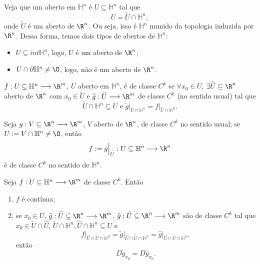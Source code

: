 Veja que um aberto em $\mathbb{H}^{n}$ é $U\subseteq\mathbb{H}^{n}$ tal que \[
U = \widetilde{U} \cap \mathbb{H}^{n}
,\] onde $\widetilde{U}$ é um aberto de $\R^{n}$. Ou seja, isso é $\mathbb{H}^{n}$ munido da topologia induzida por $\R^{n}$. Dessa forma, temos dois tipos de abertos de $\mathbb{H}^{n}$:
\begin{itemize}
    \item $U\subseteq int \mathbb{H}^{n}$, logo, $U$ é um aberto de $\R^{n}$;
    \item $U\cap \partial \mathbb{H}^{n} \neq  \O$, logo, não é um aberto de $\R^{n}$.
\end{itemize}

\begin{definition}
    $f: U\subseteq \mathbb{H}^{n} \longrightarrow \R^{m}$, $U$ aberto em $\mathbb{H}^{n}$, é de classe $C^{k}$ se $\forall x_0\in U$, $\exists \widetilde{U}\subseteq\R^{n}$ aberto de $\R^{n}$ com $x_0\in \widetilde{U}$ e $\widetilde{g}: \widetilde{U} \longrightarrow \R^{m}$ de classe $C^{k}$ (no sentido usual) tal que \[
    \widetilde{U} \cap \mathbb{H}^{n} \subseteq U\text{ e }\widetilde{g}\Big|_{\widetilde{U}\cap \mathbb{H}^{n}} = f\Big|_{\widetilde{U}\cap \mathbb{H}^{n}}
    .\] 
\end{definition}

\begin{remark}
    Seja $g: V\subseteq\R^{n} \longrightarrow \R^{m}$, $V$ aberto de $\R^{n}$, de classe $C^{k}$ no sentido usual; se $U:=V\cap \mathbb{H}^{n}\neq \O$, então \[
    f:= g\Big|_U: U\subseteq \mathbb{H}^{n} \longrightarrow \R^{n}
    \] é de classe $C^{k}$ no sentido de $\mathbb{H}^{n}$.
\end{remark}

\begin{prop}
    Seja $f: U\subseteq\mathbb{H}^{n} \longrightarrow \R^{m}$ de classe $C^{k}$. Então
    \begin{enumerate}
        \item $f$ é contínua;
	\item se $x_0\in U$, $\widetilde{g}: \widetilde{U}\subseteq\R^{n} \longrightarrow \R^{m}$, $\hat{g}: \hat{U} \subseteq\R^{n} \longrightarrow \R^{m} $ são de classe $C^{k}$ tal que $x_0\in \widetilde{U}\cap \hat{U}$, $\widetilde{U}\cap \mathbb{H}^{n}, \hat{U}\cap \mathbb{H}^{n} \subseteq U$ e \[
	f\Big|_{\hat{U}\cap \widetilde{U}\cap \mathbb{H}^{n}} =\widetilde{g}\Big|_{\hat{U}\cap \widetilde{U}\cap \mathbb{H}^{n}} = \hat{g}\Big|_{\hat{U}\cap \widetilde{U}\cap \mathbb{H}^{n}}
	,\] então \[
	D\widetilde{g}_{x_0} = D\hat{g}_{x_0}
	.\] 
    \end{enumerate}
\end{prop}


